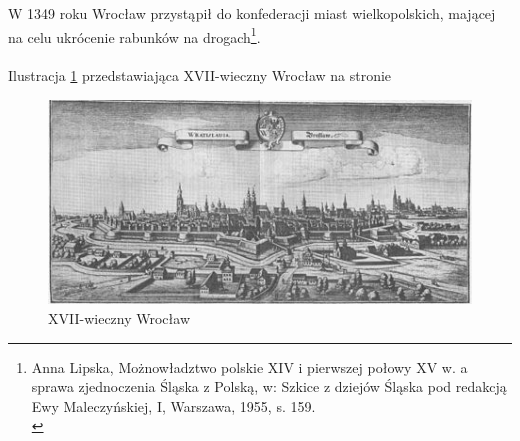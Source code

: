 \documentclass{article}
\begin{document}
W 1349 roku Wrocław przystąpił do konfederacji miast wielkopolskich, mającej na celu ukrócenie rabunków na drogach\footnote{Anna Lipska, Możnowładztwo polskie XIV i pierwszej połowy XV w. a sprawa zjednoczenia Śląska z Polską, w: Szkice z dziejów Śląska pod redakcją Ewy Maleczyńskiej, I, Warszawa, 1955, s. 159.\\}.\\
\\
Ilustracja \ref{fig:XVII} przedstawiająca XVII-wieczny Wrocław na stronie \pageref{fig:XVII}
\begin{figure}[h!]
\centering
\includegraphics[scale=1]{450px-Breslau_merian.jpg}
\caption{XVII-wieczny Wrocław}
\label{fig:XVII}
\end{figure}
\end{document}
